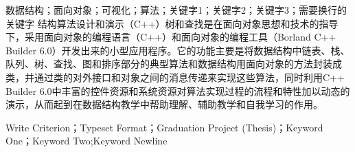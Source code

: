 \begin{cnabstract}{数据结构；面向对象；可视化；算法；关键字1；关键字2；关键字3；需要换行的关键字}
结构算法设计和演示（C++）树和查找是在面向对象思想和技术的指导下，采用面向对象的编程语言（C++）和面向对象的编程工具（Borland C++ Builder 6.0）开发出来的小型应用程序。它的功能主要是将数据结构中链表、栈、队列、树、查找、图和排序部分的典型算法和数据结构用面向对象的方法封装成类，并通过类的对外接口和对象之间的消息传递来实现这些算法，同时利用C++ Builder 6.0中丰富的控件资源和系统资源对算法实现过程的流程和特性加以动态的演示，从而起到在数据结构教学中帮助理解、辅助教学和自我学习的作用。
\end{cnabstract}


\begin{enabstract}{Write Criterion；Typeset Format；Graduation Project (Thesis)；Keyword One；Keyword Two;Keyword Newline}
\lipsum[10]
\end{enabstract}